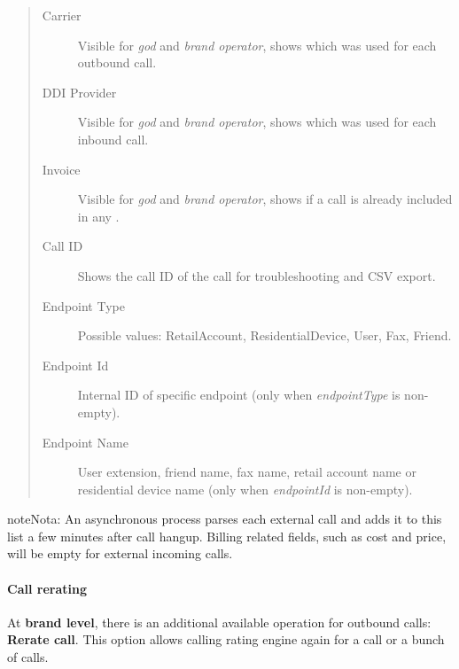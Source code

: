 \documentclass[letterpaper,10pt,spanish]{sphinxmanual}
\begin{document}
\begin{quote}
\begin{description}
\item[{Carrier}] \leavevmode
Visible for \emph{god} and \emph{brand operator}, shows which {\hyperref[administration_portal/brand/providers/carriers:carriers]{}} was used for each outbound call.

\item[{DDI Provider}] \leavevmode
Visible for \emph{god} and \emph{brand operator}, shows which {\hyperref[administration_portal/brand/providers/ddi_providers:ddi\string-providers]{}} was used for each inbound call.

\item[{Invoice}] \leavevmode
Visible for \emph{god} and \emph{brand operator}, shows if a call is already included in any {\hyperref[administration_portal/brand/invoicing/invoices:invoices]{}}.

\item[{Call ID}] \leavevmode
Shows the call ID of the call for troubleshooting and CSV export.

\item[{Endpoint Type}] \leavevmode
Possible values: RetailAccount, ResidentialDevice, User, Fax, Friend.

\item[{Endpoint Id}] \leavevmode
Internal ID of specific endpoint (only when \emph{endpointType} is non-empty).

\item[{Endpoint Name}] \leavevmode
User extension, friend name, fax name, retail account name or residential device name (only when \emph{endpointId} is non-empty).

\end{description}
\end{quote}

\begin{notice}{note}{Nota:}
An asynchronous process parses each external call and adds it to this list a few minutes after call hangup. Billing related fields, such as cost and price, will be empty for external incoming calls.
\end{notice}


\paragraph{Call rerating}
\label{administration_portal/client/retail/calls/call_recordings:call-rerating}
At \textbf{brand level}, there is an additional available operation for outbound calls: \textbf{Rerate call}. This option allows calling rating engine again for a call or a bunch of calls.
\end{document}
